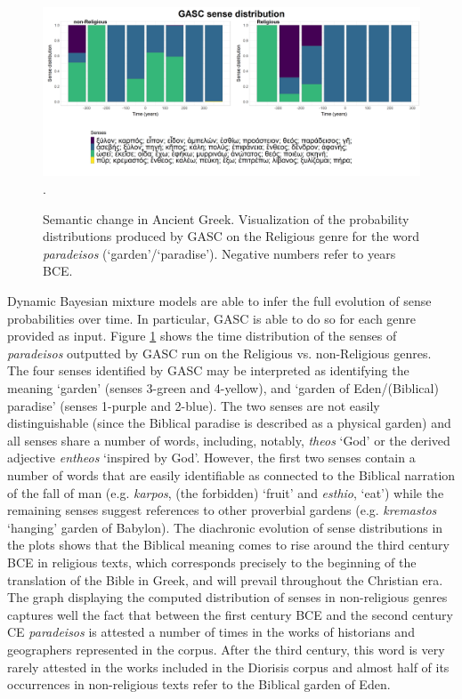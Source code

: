 \documentclass[output=paper%
]{langscibook}
\begin{document}
\begin{figure}
\includegraphics[width=\textwidth]{figures/PERRONE_paradeisos400AC.png}.
\caption{Semantic change in Ancient Greek. Visualization of the probability distributions produced by GASC on the Religious genre for the word \emph{paradeisos} (`garden'\slash`paradise'). Negative numbers refer to years BCE.\label{paradeisos}}
\end{figure}

\begin{sloppypar}
Dynamic Bayesian mixture models are able to infer the full evolution of sense probabilities over time. In particular, GASC is able to do so for each genre provided as input. Figure \ref{paradeisos} shows the time distribution of the senses of \emph{paradeisos} outputted by GASC run on the Religious vs. non-Religious genres. 
The four senses identified by GASC may be interpreted as identifying the meaning `garden' (senses 3-green and 4-yellow),  and `garden of Eden\slash(Biblical) paradise' (senses 1-purple and 2-blue). The two senses are not easily distinguishable (since the Biblical paradise is described as a physical garden) and all senses share a number of words, including, notably, \emph{theos} `God' or the derived adjective \emph{entheos} `inspired by God'. However, the first two senses contain a number of words that are easily identifiable as connected to the Biblical narration of the fall of man (e.g. \emph{karpos}, (the forbidden) `fruit' and \emph{esthio}, `eat') while the remaining senses suggest references to other proverbial gardens (e.g. \emph{kremastos} `hanging' garden of Babylon). The diachronic evolution of sense distributions in the plots shows that the Biblical meaning comes to rise around the third century BCE in religious texts, which corresponds precisely to the beginning of the translation of the Bible in Greek, and will prevail throughout the Christian era. The graph displaying the computed distribution of senses in non-religious genres captures well the fact that between the first century BCE and the second century CE \emph{paradeisos} is attested a number of times in the works of historians and geographers represented in the corpus. After the third century, this word is very rarely attested in the works included in the Diorisis corpus and almost half of its occurrences in non-religious texts refer to the Biblical garden of Eden.
\end{sloppypar}
\end{document}
